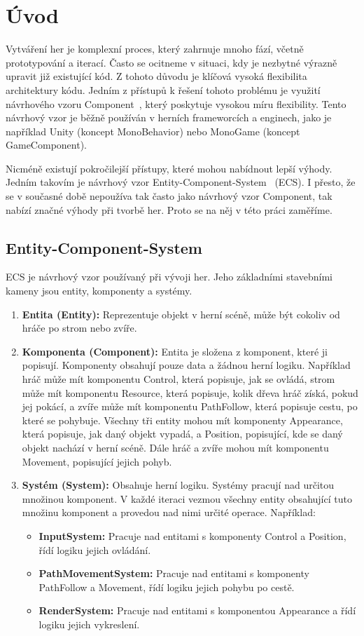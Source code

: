 \chapter{Úvod}

Vytváření her je komplexní proces, který zahrnuje mnoho fází, včetně prototypování a iterací. Často se ocitneme v situaci, kdy je nezbytné výrazně upravit již existující kód. Z tohoto důvodu je klíčová vysoká flexibilita architektury kódu. Jedním z přístupů k řešení tohoto problému je využití návrhového vzoru Component~\cite{nystrom2014game}, který poskytuje vysokou míru flexibility. Tento návrhový vzor je běžně používán v herních frameworcích a enginech, jako je například Unity (koncept MonoBehavior) nebo MonoGame (koncept GameComponent). 

Nicméně existují pokročilejší přístupy, které mohou nabídnout lepší výhody. Jedním takovím je návrhový vzor Entity-Component-System~\cite{Caini_2019} (ECS). I přesto, že se v současné době nepoužíva tak často jako návrhový vzor Component, tak nabízí značné výhody při tvorbě her. Proto se na něj v této práci zaměříme.

\section{Entity-Component-System}
ECS je návrhový vzor používaný při vývoji her. Jeho základními stavebními kameny jsou entity, komponenty a systémy.

\begin{enumerate}
    \item \textbf{Entita (Entity):} Reprezentuje objekt v herní scéně, může být cokoliv od hráče po strom nebo zvíře.
    \item \textbf{Komponenta (Component):} Entita je složena z komponent, které ji popisují. Komponenty obsahují pouze data a žádnou herní logiku. Například hráč může mít komponentu Control, která popisuje, jak se ovládá, strom může mít komponentu Resource, která popisuje, kolik dřeva hráč získá, pokud jej pokácí, a zvíře může mít komponentu PathFollow, která popisuje cestu, po které se pohybuje. Všechny tři entity mohou mít komponenty Appearance, která popisuje, jak daný objekt vypadá, a Position, popisující, kde se daný objekt nachází v herní scéně. Dále hráč a zvíře mohou mít komponentu Movement, popisující jejich pohyb.
    \item \textbf{Systém (System):} Obsahuje herní logiku. Systémy pracují nad určitou množinou komponent. V každé iteraci vezmou všechny entity obsahující tuto množinu komponent a provedou nad nimi určité operace. Například:
    \begin{itemize}
        \item \textbf{InputSystem:} Pracuje nad entitami s komponenty Control a Position, řídí logiku jejich ovládání.
        \item \textbf{PathMovementSystem:} Pracuje nad entitami s komponenty PathFollow a Movement, řídí logiku jejich pohybu po cestě.
        \item \textbf{RenderSystem:} Pracuje nad entitami s komponentou Appearance a řídí logiku jejich vykreslení.
    \end{itemize}
\end{enumerate}

